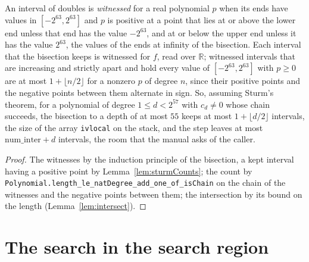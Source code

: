 \begin{lemma}\label{lem:sturmBuffers}
  \leanok
  An interval of doubles is \emph{witnessed} for a real polynomial $p$ when its ends have values in
  $[-2^{63}, 2^{63}]$ and $p$ is positive at a point that lies at or above the lower end unless that
  end has the value $-2^{63}$, and at or below the upper end unless it has the value $2^{63}$, the
  values of the ends at infinity of the bisection. Each interval that the bisection keeps is
  witnessed for $f$, read over $\mathbb{R}$; witnessed intervals that are increasing and strictly
  apart and hold every value of $[-2^{63}, 2^{63}]$ with $p \ge 0$ are at most
  $1 + \lfloor n/2 \rfloor$ for a nonzero $p$ of degree $n$, since their positive points and the
  negative points between them alternate in sign. So, assuming Sturm's theorem, for a polynomial of
  degree $1 \le d < 2^{57}$ with $c_d \ne 0$ whose chain succeeds, the bisection to a depth of at
  most $55$ keeps at most $1 + \lfloor d/2 \rfloor$ intervals, the size of the array \verb|ivlocal|
  on the stack, and the step leaves at most $\mathrm{num\_inter} + d$ intervals, the room that the
  manual asks of the caller.
\end{lemma}

\begin{proof}
  \leanok
  The witnesses by the induction principle of the bisection, a kept interval having a positive point
  by Lemma~\ref{lem:sturmCounts}; the count by
  \verb|Polynomial.length_le_natDegree_add_one_of_isChain| on the chain of the witnesses and the
  negative points between them; the intersection by its bound on the length
  (Lemma~\ref{lem:intersect}).
\end{proof}

\section{The search in the search region}\label{sec:regionSearch}

